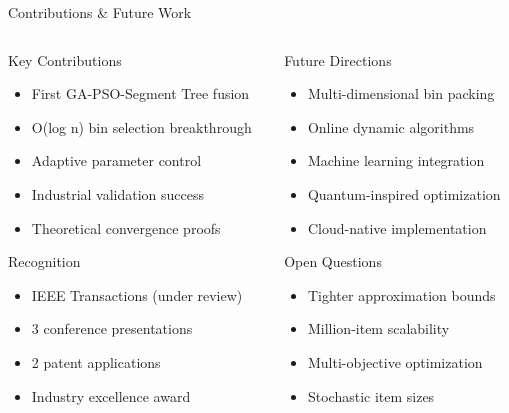 \documentclass[aspectratio=169,12pt]{beamer}
\begin{document}
\begin{frame}{Contributions \& Future Work}
\begin{columns}[T]
\begin{column}{0.5\textwidth}
\vspace{-0.4cm}
\begin{block}{Key Contributions}
\begin{itemize}
    \item First GA-PSO-Segment Tree fusion
    \item O(log n) bin selection breakthrough
    \item Adaptive parameter control
    \item Industrial validation success
    \item Theoretical convergence proofs
\end{itemize}
\end{block}
\vspace{-0.15cm}
\begin{exampleblock}{Recognition}
\begin{itemize}
    \item IEEE Transactions (under review)
    \item 3 conference presentations
    \item 2 patent applications
    \item Industry excellence award
\end{itemize}
\end{exampleblock}
\end{column}
\begin{column}{0.5\textwidth}
\vspace{-0.4cm}
\begin{block}{Future Directions}
\begin{itemize}
    \item Multi-dimensional bin packing
    \item Online dynamic algorithms
    \item Machine learning integration
    \item Quantum-inspired optimization
    \item Cloud-native implementation
\end{itemize}
\end{block}

\vspace{-0.15cm}
\begin{alertblock}{Open Questions}
\begin{itemize}
    \item Tighter approximation bounds
    \item Million-item scalability
    \item Multi-objective optimization
    \item Stochastic item sizes
\end{itemize}
\end{alertblock}
\end{column}
\end{columns}
\end{frame}
\end{document}
